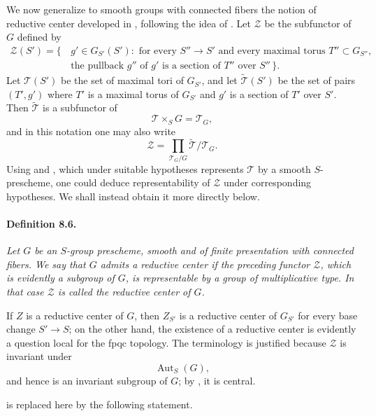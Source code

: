 We now generalize to smooth groups with connected fibers the notion
of reductive center developed in , following the idea of
. Let \(\mathcal Z\) be the subfunctor of \(G\) defined by
\[
\begin{split}
  \mathcal Z(S')=\{\, &g'\in G_{S'}(S'):\text{ for every }
  S''\to S'\text{ and every maximal torus }T''\subset G_{S''},\\
  &\text{the pullback }g''\text{ of }g'\text{ is a section of }
  T''\text{ over }S''\,\}.
\end{split}
\]
Let \(\mathcal T(S')\) be the set of maximal tori of \(G_{S'}\), and
let \(\widetilde{\mathcal T}(S')\) be the set of pairs \((T',g')\)
where \(T'\) is a maximal torus of \(G_{S'}\) and \(g'\) is a section
of \(T'\) over \(S'\). Then \(\widetilde{\mathcal T}\) is a
subfunctor of
\[
  \mathcal T\times_S G=\mathcal T_G,
\]
and in this notation one may also write
\[
  \mathcal Z=
  \prod_{\mathcal T_G/G}
  \widetilde{\mathcal T}/\mathcal T_G.
\]
Using  and , which under suitable hypotheses represents
\(\mathcal T\) by a smooth \(S\)-prescheme, one could deduce
representability of \(\mathcal Z\) under corresponding hypotheses.
We shall instead obtain it more directly below.

\paragraph{\textbf{Definition 8.6.}}
\emph{Let \(G\) be an \(S\)-group prescheme, smooth and of finite
presentation with connected fibers. We say that \(G\) admits a
\emph{reductive center} if the preceding functor \(\mathcal Z\),
which is evidently a subgroup of \(G\), is representable by a group
of multiplicative type. In that case \(\mathcal Z\) is called the
reductive center of \(G\).}

If \(Z\) is a reductive center of \(G\), then \(Z_{S'}\) is a
reductive center of \(G_{S'}\) for every base change \(S'\to S\);
on the other hand, the existence of a reductive center is evidently a
question local for the fpqc topology. The terminology is justified because \(\mathcal Z\)
is invariant under
\[
  \operatorname{Aut}_S(G),
\]
and hence is an invariant subgroup of \(G\); by , it is
central.

 is replaced here by the following statement.

